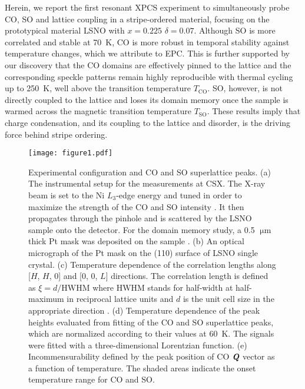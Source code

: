\documentclass[aps,prl,showpacs,floatfix,twocolumn,superscriptaddress,longbibliography]{revtex4-1}
\def\mathbi#1{\ensuremath{\textbf{\em #1}}}
\def\Q{\mathbi{Q}}
\def\TCO{\ensuremath{T_{\mathrm{CO}}}}
\def\TSO{\ensuremath{T_{\mathrm{SO}}}}
\def\um{\ensuremath{\upmu\text{m}}}
\begin{document}
Herein, we report the first resonant \gls{XPCS} experiment to simultaneously probe \gls{CO}, \gls{SO} and lattice coupling in a stripe-ordered material, focusing on the prototypical material \gls{LSNO} with $x=0.225$ $\delta=0.07$. Although \gls{SO} is more correlated and stable at 70~K, \gls{CO} is more robust in temporal stability against temperature changes, which we attribute to \gls{EPC}. This is further supported by our discovery that the \gls{CO} domains are effectively pinned to the lattice and the corresponding speckle patterns remain highly reproducible with thermal cycling up to 250~K, well above the transition temperature {\TCO}. \gls{SO}, however, is not directly coupled to the lattice and loses its domain memory once the sample is warmed across the magnetic transition temperature {\TSO}. These results imply that charge condensation, and its coupling to the lattice and disorder, is the driving force behind stripe ordering.

\begin{figure}[t]
\texttt{[image: figure1.pdf]}
\caption{Experimental configuration and \acrfull{CO} and \acrfull{SO} superlattice peaks. (a) The instrumental setup for the measurements at CSX. The X-ray beam is set to the Ni $L_3$-edge energy and tuned in order to maximize the strength of the \gls{CO} and \gls{SO} intensity \cite{supp}. It then propagates through the pinhole and is scattered by the \acrfull{LSNO} sample onto the detector. For the domain memory study, a 0.5 {\um} thick Pt mask was deposited on the sample \cite{supp}. (b) An optical micrograph of the Pt mask on the (110) surface of \gls{LSNO} single crystal. (c) Temperature dependence of the correlation lengths along [$H$, $H$, 0] and [0, 0, $L$] directions. The correlation length is defined as $\xi = d/\textrm{HWHM}$ where $\textrm{HWHM}$ stands for half-width at half-maximum in reciprocal lattice units and $d$ is the unit cell size in the appropriate direction \cite{incommensurability}. (d) Temperature dependence of the peak heights evaluated from fitting of the \gls{CO} and \gls{SO} superlattice peaks, which are normalized according to their values at 60~K. The signals were fitted with a three-dimensional Lorentzian function. (e) Incommensurability defined by the peak position of \gls{CO} {\Q} vector as a function of temperature. The shaded areas indicate the onset temperature range for \gls{CO} and \gls{SO}.}
\end{figure}
\end{document}
